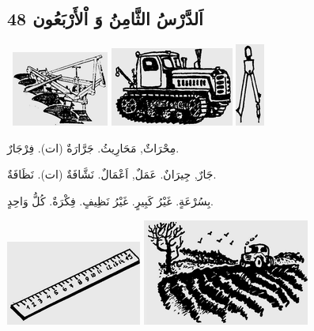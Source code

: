 \documentclass[a5paper]{article}
\begin{document}
\subsection{اَلدَّرْسُ الثَّامِنُ وَ اْلأَرْبَعُون 48}
\  \includegraphics[width=1.25in,height=0.9689in]{images/MuhammadBagauddinprettified-img156.png}   \includegraphics[width=1.5937in,height=1.0209in]{images/MuhammadBagauddinprettified-img157.png}   \includegraphics[width=0.3752in,height=1.0728in]{images/MuhammadBagauddinprettified-img158.png} 

مِحْرَاثٌ, مَحَارِيثُ. جَرَّارَةٌ (ات). فِرْجَارٌ. 

جَارٌ, جِيرَانٌ. عَمَلٌ, اَعْمَالٌ. نَشَّافَةٌ (ات). نَظَافَةٌ.

بِسُرْعَةٍ. غَيْرُ كَبِيرٍ. غَيْرُ نَظِيفٍ. فِكْرَةٌ. كُلُّ وَاحِدٍ.

 \includegraphics[width=1.75in,height=1.0937in]{images/MuhammadBagauddinprettified-img159.png}   \includegraphics[width=2.1563in,height=1.3752in]{images/MuhammadBagauddinprettified-img160.png} 
\end{document}
